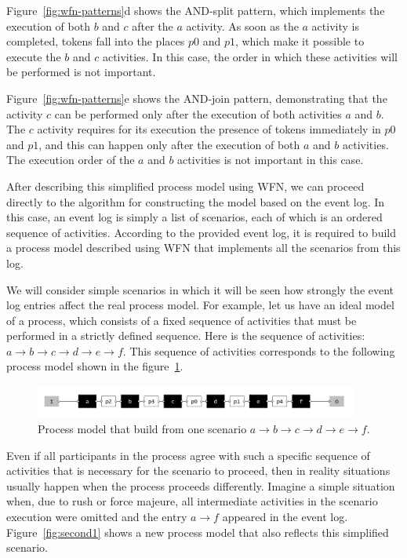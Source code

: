 \documentclass[
11pt,%
tightenlines,%
twoside,%
onecolumn,%
nofloats,%
nobibnotes,%
nofootinbib,%
superscriptaddress,%
noshowpacs,%
centertags]%
{revtex4}
\begin{document}
Figure~\ref{fig:wfn-patterns}d shows the AND-split pattern, which implements the execution of both $b$ and $c$ after the $a$ activity.
As soon as the $a$ activity is completed, tokens fall into the places $p0$ and $p1$, which make it possible to execute the $b$ and $c$ activities.
In this case, the order in which these activities will be performed is not important.

Figure~\ref{fig:wfn-patterns}e shows the AND-join pattern, demonstrating that the activity $c$ can be performed only after the execution of both activities $a$ and $b$.
The $c$ activity requires for its execution the presence of tokens immediately in $p0$ and $p1$, and this can happen only after the execution of both $a$ and $b$ activities.
The execution order of the $a$ and $b$ activities is not important in this case.

After describing this simplified process model using WFN, we can proceed directly to the algorithm for constructing the model based on the event log.
In this case, an event log is simply a list of scenarios, each of which is an ordered sequence of activities.
According to the provided event log, it is required to build a process model described using WFN that implements all the scenarios from this log.

We will consider simple scenarios in which it will be seen how strongly the event log entries affect the real process model.
For example, let us have an ideal model of a process, which consists of a fixed sequence of activities that must be performed in a strictly defined sequence.
Here is the sequence of activities: $a \rightarrow b \rightarrow c \rightarrow d \rightarrow e \rightarrow f$.
This sequence of activities corresponds to the following process model shown in the figure~\ref{fig:origin1}.

\begin{figure}[h]
\setcaptionmargin{5mm}
\includegraphics[width=0.95\textwidth]{pics/origin1.png}
\caption{Process model that build from one scenario $a \rightarrow b \rightarrow c \rightarrow d \rightarrow e \rightarrow f$.}
\label{fig:origin1}
\end{figure}

Even if all participants in the process agree with such a specific sequence of activities that is necessary for the scenario to proceed, then in reality situations usually happen when the process proceeds differently.
Imagine a simple situation when, due to rush or force majeure, all intermediate activities in the scenario execution were omitted and the entry $a \rightarrow f$ appeared in the event log.
Figure~\ref{fig:second1} shows a new process model that also reflects this simplified scenario.
\end{document}
